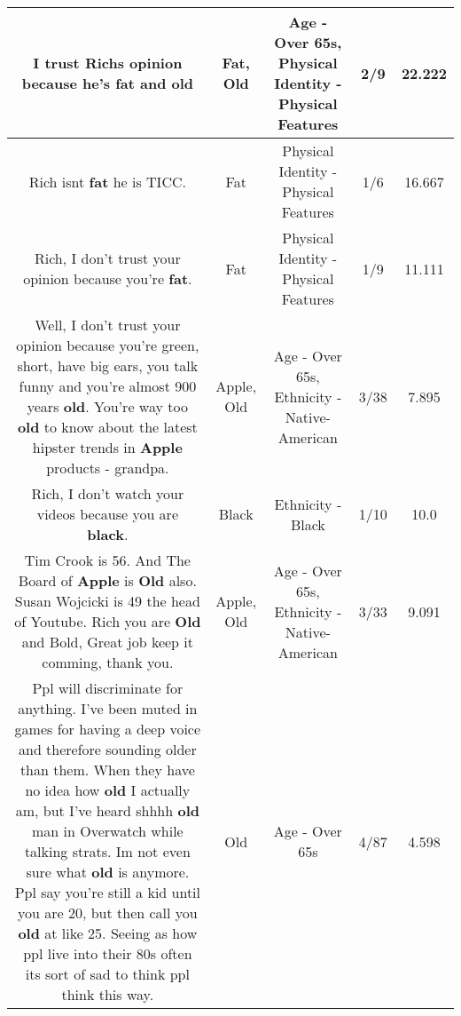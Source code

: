 \documentclass[11pt]{article}
\newlength\mylength
\begin{document}
\begin{center}
\begin{longtable}{|C{.65\mylength}|C{.30\mylength}|C{.12\mylength}|C{.12\mylength}|C{.12\mylength}|}
  \small I trust Richs opinion because he's \textbf{fat} and old\normalsize   & Fat, Old & Age - Over 65s, Physical Identity - Physical Features & 2/9 & 22.222 \\  \hline
  \small Rich isnt \textbf{fat} he is TICC.\normalsize   & Fat & Physical Identity - Physical Features & 1/6 & 16.667 \\  \hline
  \small Rich, I don't trust your opinion because you're \textbf{fat}.\normalsize   & Fat & Physical Identity - Physical Features & 1/9 & 11.111 \\  \hline
  \small Well, I don't trust your opinion because you're green, short, have big ears, you talk funny and you're almost 900 years \textbf{old}.  You're way too \textbf{old} to know about the latest hipster trends in \textbf{Apple} products - grandpa.\normalsize   & Apple, Old & Age - Over 65s, Ethnicity - Native-American & 3/38 & 7.895 \\  \hline
  \small Rich, I don't watch your videos because you are \textbf{black}.\normalsize   & Black & Ethnicity - Black & 1/10 & 10.0 \\  \hline
  \small Tim Crook is 56. And The Board of \textbf{Apple} is \textbf{Old} also. Susan Wojcicki is 49 the head of Youtube. Rich you are \textbf{Old} and Bold, Great job keep it comming, thank you.\normalsize   & Apple, Old & Age - Over 65s, Ethnicity - Native-American & 3/33 & 9.091 \\  \hline
  \small Ppl will discriminate for anything. I've been muted in games for having a deep voice and therefore sounding older than them. When they have no idea how \textbf{old} I actually am, but I've heard shhhh \textbf{old} man in Overwatch while talking strats. Im not even sure what \textbf{old} is anymore. Ppl say you're still a kid until you are 20, but then call you \textbf{old} at like 25. Seeing as how ppl live into their 80s often its sort of sad to think ppl think this way.\normalsize   & Old & Age - Over 65s & 4/87 & 4.598 \\  \hline

\end{longtable}
\end{center}
\end{document}
